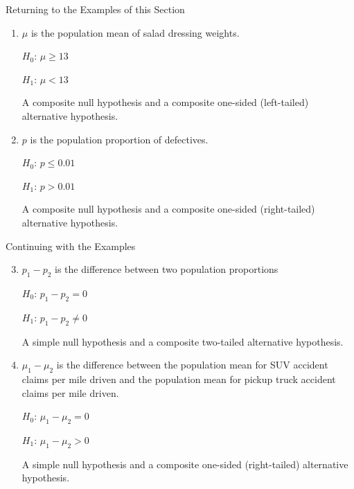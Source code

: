 \documentclass[pdf]{beamer}
\theoremstyle{remark}
\theoremstyle{definition}
\begin{document}
\begin{frame}[t]{Returning to the Examples of this Section}
\small
\begin{enumerate}
    \item $\mu$ is the population mean of salad dressing weights. 
    \begin{center} $H_0$: $\mu \geq 13$ \end{center} 
    \begin{center} $H_1$: $\mu < 13$  \end{center}
    A composite null hypothesis and a composite one-sided (left-tailed) alternative hypothesis. 
    \item $p$ is the population proportion of defectives. 
    \begin{center} $H_0$: $p \leq 0.01$ \end{center} 
    \begin{center} $H_1$: $p > 0.01$  \end{center}
    A composite null hypothesis and a composite one-sided (right-tailed) alternative hypothesis. 
\end{enumerate}
\end{frame}

\begin{frame}[t]{Continuing with the Examples}
\small
\begin{enumerate}
  \setcounter{enumi}{2}
    \item $p_1 - p_2$ is the difference between two population proportions 
    \begin{center} $H_0$: $p_1 - p_2 = 0$ \end{center} 
    \begin{center} $H_1$: $p_1 - p_2 \ne 0 $  \end{center}
    A simple null hypothesis and a composite two-tailed alternative hypothesis. 
    \item $\mu_1 - \mu_2$ is the difference between the population mean for SUV accident claims per mile driven and the population mean for pickup truck accident claims per mile driven.
    \begin{center} $H_0$: $\mu_1 - \mu_2 = 0$ \end{center} 
    \begin{center} $H_1$: $\mu_1 - \mu_2 > 0 $  \end{center}
    A simple null hypothesis and a composite one-sided (right-tailed) alternative hypothesis. 
\end{enumerate}
\end{frame}
\end{document}
